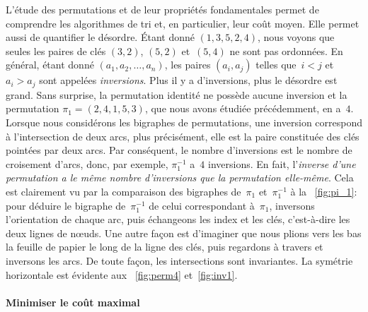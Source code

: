 L'étude des permutations et de leur propriétés fondamentales permet de
comprendre les algorithmes de tri et, en particulier, leur coût
moyen. Elle permet aussi de quantifier le désordre. Étant donné
\((1,3,5,2,4)\), nous voyons que seules les paires de clés \((3,2)\),
\((5,2)\) et~\((5,4)\) ne sont pas ordonnées. En général, étant donné
\((a_1, a_2, \dots, a_n)\), les paires \((a_i,a_j)\) telles que~\(i <
j\) et~\(a_i > a_j\) sont appelées
\emph{inversions}. Plus il y a
d'inversions, plus le désordre est grand. Sans surprise, la
permutation identité ne possède aucune
inversion et la permutation \(\pi_1 = (2,4,1,5,3)\), que nous avons
étudiée précédemment, en a~\(4\). Lorsque nous considérons les
bigraphes de permutations, une
inversion correspond à l'intersection de
deux arcs, plus précisément, elle est la paire constituée des clés
pointées par deux arcs. Par conséquent, le nombre d'inversions
 est le nombre de croisement d'arcs,
donc, par exemple, \(\pi_1^{-1}\) a~\(4\) inversions. En fait,
l'\emph{inverse d'une permutation a le même
  nombre d'inversions que la
  permutation elle-même}. Cela est clairement vu
par la comparaison des bigraphes
de~\(\pi_1\) et~\(\pi_1^{-1}\) à la \fig~\vref{fig:pi_1}: pour déduire
le bigraphe de~\(\pi_1^{-1}\) de celui correspondant à~\(\pi_1\),
inversons l'orientation de chaque arc, puis échangeons les index et
les clés, c'est-à-dire les deux lignes de n{\oe}uds. Une autre façon
est d'imaginer que nous plions vers les bas la feuille de papier le
long de la ligne des clés, puis regardons à travers et inversons les
arcs. De toute façon, les intersections sont invariantes. La symétrie
horizontale est évidente aux \figs~\ref{fig:perm4} et~\ref{fig:inv1}.

\paragraph{Minimiser le coût maximal}
\label{par:minimax}

